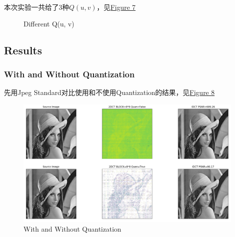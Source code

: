 \documentclass[UTF8]{ctexart}
\begin{document}
	本次实验一共给了3种$Q(u, v)$，见\hyperref[Fig.Q]{Figure 7}
	\begin{figure}[htbp]
		\centering 
		\caption{Different Q(u, v)}
		\label{Fig.Q}
	\end{figure}
	
	
	\subsection{Results}
	
	\subsubsection{With and Without Quantization} 
	先用Jpeg Standard对比使用和不使用Quantization的结果，见\hyperref[Fig.part2-0]{Figure 8}
	
	\begin{figure}[htbp]
		\centering
		\includegraphics[width=1.0\textwidth]{../part2-0.png}
		\caption{With and Without Quantization}
		\label{Fig.part2-0}
	\end{figure}
\end{document}
